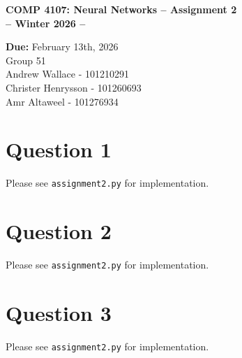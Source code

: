 \documentclass[12pt]{article}
\begin{document}
 

\begin{center} \Large\bf
COMP 4107: Neural Networks -- Assignment 2\\
-- Winter 2026 -- 
\end{center} 

\begin{center}
{\bf Due:} February 13th, 2026 \\
Group 51 \\
Andrew Wallace - 101210291\\
Christer Henrysson - 101260693\\
Amr Altaweel - 101276934\\[1em]
\end{center}

\newpage 

\section*{Question 1}
Please see \texttt{assignment2.py} for implementation.
\section*{Question 2}
Please see \texttt{assignment2.py} for implementation.
\section*{Question 3}
Please see \texttt{assignment2.py} for implementation.
\end{document}
